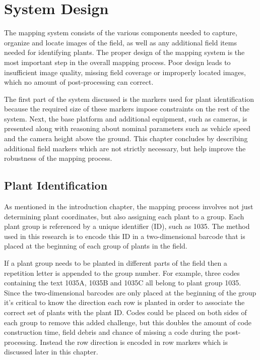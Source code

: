 
\cleardoublepage

\chapter{System Design}
\label{chapter:system_design}

The mapping system consists of the various components needed to capture, organize and locate images of the field, as well as any additional field items needed for identifying plants.  The proper design of the mapping system is the most important step in the overall mapping process.  Poor design leads to insufficient image quality, missing field coverage or improperly located images, which no amount of post-processing can correct.  

The first part of the system discussed is the markers used for plant identification because the required size of these markers impose constraints on the rest of the system.  Next, the base platform and additional equipment, such as cameras, is presented along with reasoning about nominal parameters such as vehicle speed and the camera height above the ground.  This chapter concludes by describing additional field markers which are not strictly necessary, but help improve the robustness of the mapping process. 

\section{Plant Identification}
\label{section:plantid}

As mentioned in the introduction chapter, the mapping process involves not just determining plant coordinates, but also assigning each plant to a group.  Each plant group is referenced by a unique identifier (ID), such as 1035.  The method used in this research is to encode this ID in a two-dimensional barcode that is placed at the beginning of each group of plants in the field. 

If a plant group needs to be planted in different parts of the field then a repetition letter is appended to the group number.  For example, three codes containing the text 1035A, 1035B and 1035C all belong to plant group 1035.  Since the two-dimensional barcodes are only placed at the beginning of the group it's critical to know the direction each row is planted in order to associate the correct set of plants with the plant ID.  Codes could be placed on both sides of each group to remove this added challenge, but this doubles the amount of code construction time, field debris and chance of missing a code during the post-processing.  Instead the row direction is encoded in row markers which is discussed later in this chapter.

